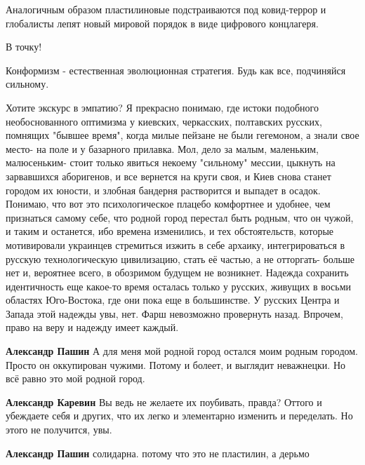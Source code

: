 \begin{itemize}
Аналогичным образом пластилиновые подстраиваются под ковид-террор и глобалисты
лепят новый мировой порядок в виде цифрового концлагеря.


В точку!


Конформизм - естественная эволюционная стратегия. Будь как все, подчиняйся сильному.


Хотите экскурс в эмпатию? Я прекрасно понимаю, где истоки подобного
необоснованного оптимизма у киевских, черкасских, полтавских русских, помнящих
"бывшее время", когда милые пейзане не были гегемоном, а знали свое место- на
поле и у базарного прилавка. Мол, дело за малым, маленьким, малюсеньким- стоит
только явиться некоему "сильному" мессии, цыкнуть на зарвавшихся аборигенов, и
все вернется на круги своя, и Киев снова станет городом их юности, и злобная
бандерня растворится и выпадет в осадок. Понимаю, что вот это психологическое
плацебо комфортнее и удобнее, чем признаться самому себе, что родной город
перестал быть родным, что он чужой, и таким и останется, ибо времена
изменились, и тех обстоятельств, которые мотивировали украинцев стремиться
изжить в себе архаику, интегрироваться в русскую технологическую цивилизацию,
стать её частью, а не отторгать- больше нет и, вероятнее всего, в обозримом
будущем не возникнет. Надежда сохранить идентичность еще какое-то время
осталась только у русских, живущих в восьми областях Юго-Востока, где они пока
еще в большинстве. У русских Центра и Запада этой надежды увы, нет. Фарш
невозможно провернуть назад. Впрочем, право на веру и надежду имеет каждый.

\begin{itemize} %
\textbf{Александр Пашин} А для меня мой родной город остался моим родным городом. Просто он оккупирован чужими. Потому и болеет, и выглядит неважнецки. Но всё равно это мой родной город.

\textbf{Александр Каревин} Вы ведь не желаете их поубивать, правда? Оттого и убеждаете себя и других, что их легко и элементарно изменить и переделать. Но этого не получится, увы.

\textbf{Александр Пашин} солидарна. потому что это не пластилин, а дерьмо


\end{itemize}
\end{itemize}
